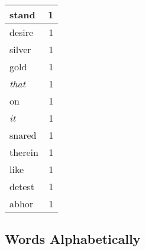 \begin{center}
\begin{longtable}{l|r}
stand & 1 \\ \hline
desire & 1 \\ \hline
silver & 1 \\ \hline
gold & 1 \\ \hline
\emph{that} & 1 \\ \hline
on & 1 \\ \hline
\emph{it} & 1 \\ \hline
snared & 1 \\ \hline
therein & 1 \\ \hline
like & 1 \\ \hline
detest & 1 \\ \hline
abhor & 1 \\ \hline
\end{longtable}
\end{center}



\normalsize



\subsection{Words Alphabetically}

